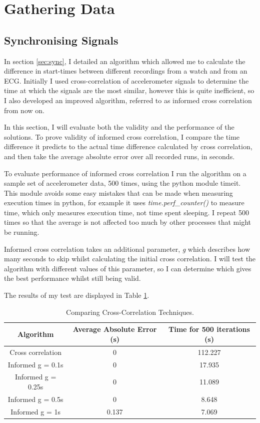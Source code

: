 \documentclass[12pt,a4paper,twoside,openany]{report}
\begin{document}
\section{Gathering Data}

\subsection{Synchronising Signals} \label{sec:evaluate-sync}

In section \ref{sec:sync}, I detailed an algorithm which allowed me to
calculate the difference in start-times between different recordings from a
watch and from an ECG. Initially I used cross-correlation of accelerometer signals to
determine the time at which the signals are the most similar, however this is
quite inefficient, so I also developed an improved algorithm, referred to as
informed cross correlation from now on.

In this section, I will evaluate both the validity and the performance of the
solutions. To prove validity of informed cross correlation, I compare the
time difference it predicts to the actual time difference calculated by cross
correlation, and then take the average absolute error over all recorded runs,
in seconds. 

To evaluate performance of informed cross correlation I run the
algorithm on a sample set of accelerometer data, 500 times, using the python
module timeit. This module avoids some easy mistakes that can be made when
measuring execution times in python, for example it uses
\emph{time.perf\_counter()} to measure time, which only measures execution
time, not time spent sleeping. I repeat 500 times so that the average is not
affected too much by other processes that might be running.

Informed cross correlation takes an additional parameter,
\emph{g} which describes how many seconds to skip whilst
calculating the initial cross correlation. I will test the algorithm with different
values of this parameter, so I can determine which gives the best performance
whilst still being valid. 

The results of my test are displayed in Table \ref{table:cross-correlation}. 

\begin{table}
\centering
\caption{Comparing Cross-Correlation Techniques.}
\label{table:cross-correlation}
\begin{tabular}{ | c | c | c | }
	\hline
	Algorithm & Average Absolute Error (s) & Time for 500
	iterations (s)\\ 
	\hline
	Cross correlation & 0 & 112.227 \\  
	Informed g = 0.1s & 0 & 17.935 \\    
	Informed g = 0.25s & 0 & 11.089 \\    
	Informed g = 0.5s & 0 & 8.648 \\    
	Informed g = 1s & 0.137 & 7.069  \\
	\hline
   \end{tabular}
\end{table}
\end{document}
